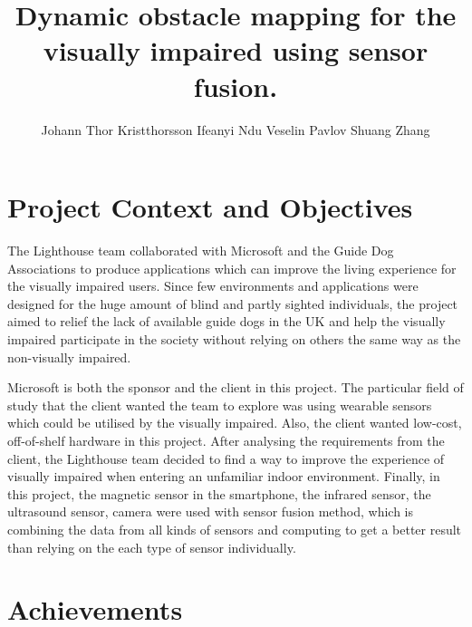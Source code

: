 \documentclass[prodmode,acmtosem]{acmsmall} %
\begin{document}

\title{Dynamic obstacle mapping for the visually impaired using sensor fusion.}
\author{Johann Thor Kristthorsson
Ifeanyi Ndu
Veselin Pavlov
Shuang Zhang
}

\maketitle

\section{Project Context and Objectives}
The Lighthouse team collaborated with Microsoft and the Guide Dog Associations to produce applications which can improve the living experience for the visually impaired users. Since few environments and applications were designed for the huge amount of blind and partly sighted individuals, the project aimed to relief the lack of available guide dogs in the UK and help the visually impaired participate in the society without relying on others the same way as the non-visually impaired. 

Microsoft is both the sponsor and the client in this project. The particular field of study that the client wanted the team to explore was using wearable sensors which could be utilised by the visually impaired. Also, the client wanted low-cost, off-of-shelf hardware in this project. After analysing the requirements from the client, the Lighthouse team decided to find a way to improve the experience of visually impaired when entering an unfamiliar indoor environment. Finally, in this project, the magnetic sensor in the smartphone, the infrared sensor, the ultrasound sensor, camera were used with sensor fusion method, which is combining the data from all kinds of sensors and computing to get a better result than relying on the each type of sensor individually.

\section{Achievements}
\end{document}

